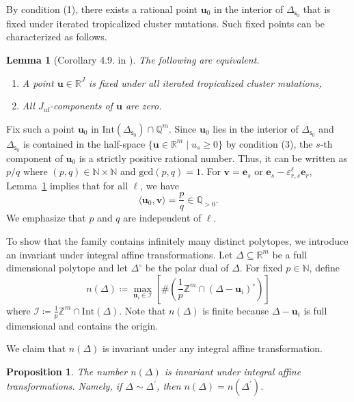 \documentclass[11pt]{amsart}
\newcommand{\Q}{\mathbb{Q}}
\newcommand{\R}{\mathbb{R}}
\newcommand{\Z}{\mathbb{Z}}
\numberwithin{equation}{section}
\theoremstyle{plain}
\newtheorem{proposition}[theorem]{Proposition}
\newtheorem{lemma}[theorem]{Lemma}
\theoremstyle{definition}
\numberwithin{equation}{section}
\newcommand{\seed}{\mathsf{s}}
\begin{document}
By condition (1), there exists a rational point $\mathbf{u}_{0}$ in the interior of $\Delta_{\seed_0}$ that is fixed under iterated tropicalized cluster mutations. 
Such fixed points can be characterized as follows.

\begin{lemma}[Corollary 4.9. in \cite{CKKP25}]\label{lemma_characfixed}
The following are equivalent. 
\begin{enumerate}
\item A point $\mathbf{u} \in \R^{J}$ is fixed under all iterated tropicalized cluster mutations,
\item All $J_\mathrm{uf}$-components of $\mathbf{u}$ are zero.
\end{enumerate}
\end{lemma} 

Fix such a point $\mathbf{u}_{0}$ in $\mathrm{Int}(\Delta_{\seed_0}) \cap \Q^m$. Since $\mathbf{u}_0$ lies in the interior of $\Delta_{\seed_0}$ and $\Delta_{\seed_0}$ is contained in the half-space $\{ \mathbf{u} \in \R^m \mid u_s \geq 0 \}$ by condition (3), the $s$-th component of $\mathbf{u}_0$ is a strictly positive rational number. Thus, it can be written as $p / q$ where $(p,q) \in \mathbb{N} \times  \mathbb{N} $ and $\mathrm{gcd}(p,q) = 1$. For $\mathbf{v} = \mathbf{e}_s$ or $\mathbf{e}_s - \varepsilon^\ell_{r,s} \mathbf{e}_r$, Lemma~\ref{lemma_characfixed} implies that for all $\ell$, we have 
$$
\langle \mathbf{u}_0, \mathbf{v} \rangle = \frac{p}{q} \in \Q_{>0}.
$$
We emphasize that $p$ and $q$ are independent of $\ell$. 

To show that the family contains infinitely many distinct polytopes, we introduce an invariant under integral affine transformations. Let $\Delta \subseteq \R^m$ be a full dimensional polytope and let $\Delta^\circ$ be the polar dual of $\Delta$. For fixed $p \in \mathbb{N}$, define 
$$
n(\Delta) \coloneqq \max_{\mathbf{u}_i \in \mathscr{I}} \left[ \# \left( \frac{1}{p} \Z^m \cap (\Delta - \mathbf{u}_i)^\circ \right) \right]
$$
where $\mathscr{I} \coloneqq \frac{1}{p}\Z^m \cap \mathrm{Int}(\Delta)$. Note that $n(\Delta)$ is finite because $\Delta - \mathbf{u}_i$ is full dimensional and contains the origin.

We claim that $n(\Delta) $ is invariant under any integral affine transformation. 

\begin{proposition}
The number $n(\Delta)$ is invariant under integral affine transformations. Namely, if $\Delta \sim \Delta^\prime$, then $n(\Delta) = n(\Delta^\prime)$.
\end{proposition}
\end{document}
